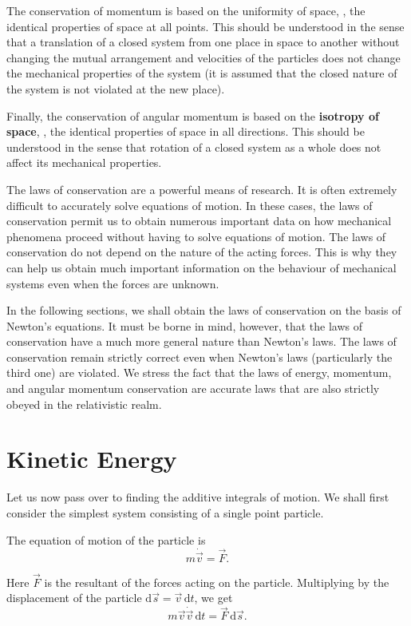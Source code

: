 The conservation of momentum is based on the uniformity of space, \ie, the identical properties of space at all points. This should be understood in the sense that a translation of a closed system from one place in space to another without changing the mutual arrangement and velocities of the particles does not change the mechanical properties of the system (it is assumed that the closed nature of the system is not violated at the new place).

Finally, the conservation of angular momentum is based on the \textbf{isotropy of space}, \ie, the identical properties of space in all directions. This should be understood in the sense that rotation of a closed system as a whole does not affect its mechanical properties.

The laws of conservation are a powerful means of research. It is often extremely difficult to accurately solve equations of motion. In these cases, the laws of conservation permit us to obtain numerous important data on how mechanical phenomena proceed without having to solve equations of motion. The laws of conservation do not depend on the nature of the acting forces. This is why they can help us obtain much important information on the behaviour of mechanical systems even when the forces are unknown.

In the following sections, we shall obtain the laws of conservation on the basis of Newton's equations. It must be borne in mind, however, that the laws of conservation have a much more general nature than Newton's laws. The laws of conservation remain strictly correct even when Newton's laws (particularly the third one) are violated. We stress the fact that the laws of energy, momentum, and angular momentum conservation are accurate laws that are also strictly obeyed in the relativistic realm.

\section{Kinetic Energy}\label{sec:3_2}

Let us now pass over to finding the additive integrals of motion. We shall first consider the simplest system consisting of a single point particle.

The equation of motion of the particle is
\begin{equation}\label{eq:3_1}
m\dot{\vec{v}} = \vec{F}.
\end{equation}

\noindent
Here $\vec{F}$ is the resultant of the forces acting on the particle. Multiplying  by the displacement of the particle $\mathrm{d}\vec{s}=\vec{v}\,\mathrm{d}t$, we get
\begin{equation}\label{eq:3_2}
m\vec{v}\dot{\vec{v}}\,\mathrm{d}t = \vec{F}\,\mathrm{d}\vec{s}.
\end{equation}

